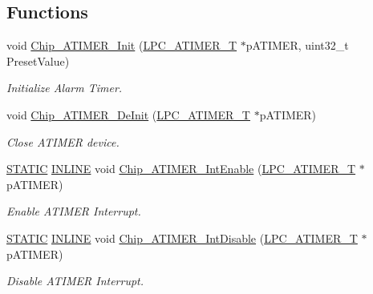\subsection*{Functions}
\begin{DoxyCompactItemize}
\item 
void \hyperlink{group___a_t_i_m_e_r__18_x_x__43_x_x_ga0d20b10ad91803e126b2a85c4881a95c}{Chip\+\_\+\+A\+T\+I\+M\+E\+R\+\_\+\+Init} (\hyperlink{struct_l_p_c___a_t_i_m_e_r___t}{L\+P\+C\+\_\+\+A\+T\+I\+M\+E\+R\+\_\+T} $\ast$p\+A\+T\+I\+M\+ER, uint32\+\_\+t Preset\+Value)
\begin{DoxyCompactList}\small\item\em Initialize Alarm Timer. \end{DoxyCompactList}\item 
void \hyperlink{group___a_t_i_m_e_r__18_x_x__43_x_x_ga638a1690aa7cbbfb64bd05961555fc74}{Chip\+\_\+\+A\+T\+I\+M\+E\+R\+\_\+\+De\+Init} (\hyperlink{struct_l_p_c___a_t_i_m_e_r___t}{L\+P\+C\+\_\+\+A\+T\+I\+M\+E\+R\+\_\+T} $\ast$p\+A\+T\+I\+M\+ER)
\begin{DoxyCompactList}\small\item\em Close A\+T\+I\+M\+ER device. \end{DoxyCompactList}\item 
\hyperlink{group___l_p_c___types___public___macros_ga10b2d890d871e1489bb02b7e70d9bdfb}{S\+T\+A\+T\+IC} \hyperlink{spifi__18xx__43xx_8h_a2eb6f9e0395b47b8d5e3eeae4fe0c116}{I\+N\+L\+I\+NE} void \hyperlink{group___a_t_i_m_e_r__18_x_x__43_x_x_ga8bf9123a5620d2dd178fa60b9a93aaa0}{Chip\+\_\+\+A\+T\+I\+M\+E\+R\+\_\+\+Int\+Enable} (\hyperlink{struct_l_p_c___a_t_i_m_e_r___t}{L\+P\+C\+\_\+\+A\+T\+I\+M\+E\+R\+\_\+T} $\ast$p\+A\+T\+I\+M\+ER)
\begin{DoxyCompactList}\small\item\em Enable A\+T\+I\+M\+ER Interrupt. \end{DoxyCompactList}\item 
\hyperlink{group___l_p_c___types___public___macros_ga10b2d890d871e1489bb02b7e70d9bdfb}{S\+T\+A\+T\+IC} \hyperlink{spifi__18xx__43xx_8h_a2eb6f9e0395b47b8d5e3eeae4fe0c116}{I\+N\+L\+I\+NE} void \hyperlink{group___a_t_i_m_e_r__18_x_x__43_x_x_gac6a9084b0b4e2a1a1995aaf5d22ca7d2}{Chip\+\_\+\+A\+T\+I\+M\+E\+R\+\_\+\+Int\+Disable} (\hyperlink{struct_l_p_c___a_t_i_m_e_r___t}{L\+P\+C\+\_\+\+A\+T\+I\+M\+E\+R\+\_\+T} $\ast$p\+A\+T\+I\+M\+ER)
\begin{DoxyCompactList}\small\item\em Disable A\+T\+I\+M\+ER Interrupt. \end{DoxyCompactList}\item 

\end{DoxyCompactItemize}
